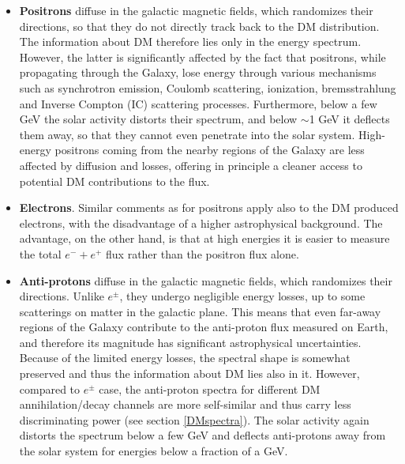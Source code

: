 \begin{itemize}
The low energy photons are, however, not limited to just the secondary production. The $X$-rays and other low energy radiation can also arise directly from the decays of light DM particles with masses in the keV to MeV range, e.g.,\ in models of DM as sterile neutrinos, or in the evaporation of PBH DM.

\item[$\circ$] {\bf Positrons} diffuse in the galactic magnetic fields, which randomizes their directions, so that they do not directly track back to the DM distribution. The information about DM therefore lies only in the energy spectrum. 
However, the latter is significantly affected by the fact that positrons, while propagating through the Galaxy, lose energy through various mechanisms such as 
synchrotron emission, Coulomb scattering, ionization, bremsstrahlung and Inverse Compton (IC) scattering processes. Furthermore, below a few GeV the solar activity distorts their spectrum, and below $\sim$1 GeV it deflects them away, so that they cannot even penetrate into the solar system. 
High-energy positrons coming from the nearby regions of the Galaxy are less affected by diffusion and losses, offering in principle a cleaner access to potential DM contributions to the flux. 


\item[$\circ$] {\bf Electrons}. Similar comments as for positrons apply also to the DM produced electrons,  with the disadvantage of a higher astrophysical background. The advantage, on the other hand, is that at high energies  it is easier to measure the total $e^- + e^+$ flux rather than the positron flux alone.

\item[$\circ$] {\bf Anti-protons} diffuse in the galactic magnetic fields, which randomizes their directions.
Unlike $e^\pm$, they undergo negligible energy losses, up to some scatterings on matter in the galactic plane.
This means that even far-away regions of the Galaxy contribute to the anti-proton flux  measured on Earth, and therefore
its magnitude 
has significant astrophysical uncertainties.
Because of the limited energy losses, the spectral shape is somewhat preserved and thus the information about DM lies also in it. However, compared to $e^\pm$ case, the anti-proton spectra for different DM annihilation/decay channels are more self-similar and thus carry less discriminating power (see section \ref{DMspectra}).
The solar activity again distorts the spectrum below a few GeV and deflects anti-protons away from the solar system for energies below a fraction of a GeV.


\end{itemize}

